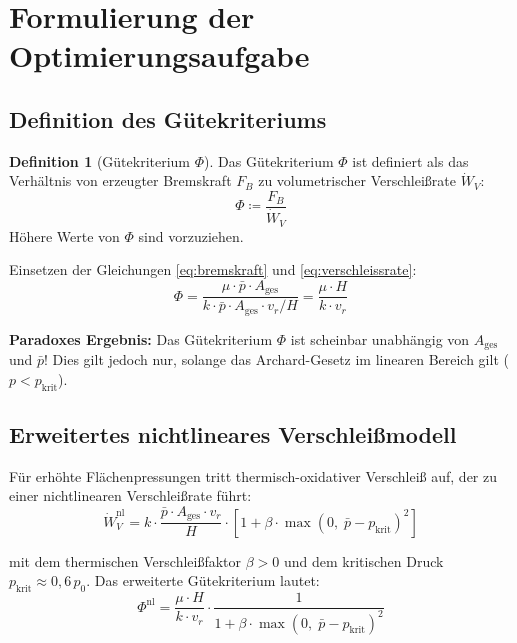 ﻿\documentclass[12pt,a4paper]{article}
\theoremstyle{definition}
\newtheorem{definition}{Definition}[section]
\begin{document}
\section{Formulierung der Optimierungsaufgabe}

\subsection{Definition des Gütekriteriums}

\begin{definition}[Gütekriterium $\Phi$]
  Das Gütekriterium $\Phi$ ist definiert als das Verhältnis von
  erzeugter Bremskraft $F_B$ zu volumetrischer Verschleißrate
  $\dot{W}_V$:
  \begin{equation}
    \Phi \coloneqq \frac{F_B}{\dot{W}_V}
    \label{eq:phi_def}
  \end{equation}
  Höhere Werte von $\Phi$ sind vorzuziehen.
\end{definition}

Einsetzen der Gleichungen \eqref{eq:bremskraft} und \eqref{eq:verschleissrate}:
\begin{equation}
  \Phi = \frac{\mu \cdot \bar{p} \cdot A_{\text{ges}}}
              {k \cdot \bar{p} \cdot A_{\text{ges}} \cdot v_r / H}
       = \frac{\mu \cdot H}{k \cdot v_r}
  \label{eq:phi_vereinfacht}
\end{equation}

\textbf{Paradoxes Ergebnis:} Das Gütekriterium $\Phi$ ist scheinbar
unabhängig von $A_{\text{ges}}$ und $\bar{p}$!  Dies gilt jedoch nur,
solange das Archard-Gesetz im linearen Bereich gilt ($p < p_{\text{krit}}$).

\subsection{Erweitertes nichtlineares Verschleißmodell}

Für erhöhte Flächenpressungen tritt thermisch-oxidativer Verschleiß auf,
der zu einer nichtlinearen Verschleißrate führt:
\begin{equation}
  \dot{W}_V^{\text{nl}} = k \cdot \frac{\bar{p} \cdot A_{\text{ges}} \cdot v_r}{H}
  \cdot \left[1 + \beta \cdot \max\!\left(0,\;\bar{p} - p_{\text{krit}}\right)^2\right]
  \label{eq:archard_nl}
\end{equation}

mit dem thermischen Verschleißfaktor $\beta > 0$ und dem kritischen Druck
$p_{\text{krit}} \approx 0{,}6\,p_0$.  Das erweiterte Gütekriterium lautet:
\begin{equation}
  \Phi^{\text{nl}} = \frac{\mu \cdot H}{k \cdot v_r}
  \cdot \frac{1}{1 + \beta \cdot \max\!\left(0,\;\bar{p} - p_{\text{krit}}\right)^2}
  \label{eq:phi_nl}
\end{equation}
\end{document}
